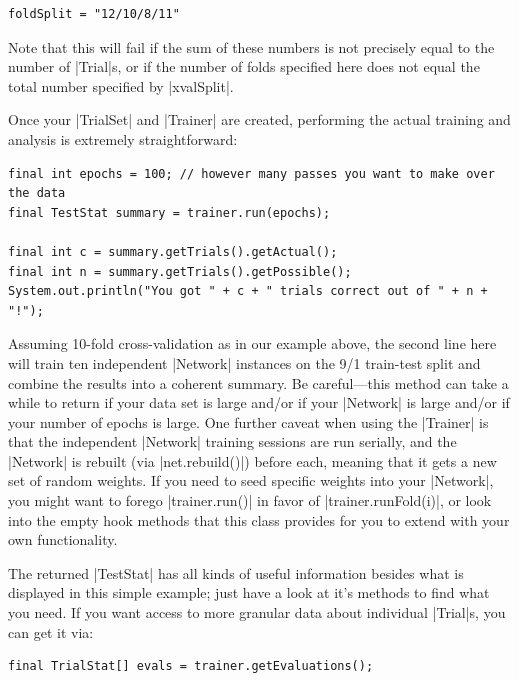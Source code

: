 \documentclass{article}
\begin{document}
\begin{verbatim}
foldSplit = "12/10/8/11"
\end{verbatim}

Note that this will fail if the sum of these numbers is not precisely equal to the number of  |Trial|s,
or if the number of folds specified here does not equal the total number specified by |xvalSplit|.

Once your  |TrialSet| and |Trainer| are created, performing the actual training and analysis
is extremely straightforward:


\begin{verbatim}
final int epochs = 100; // however many passes you want to make over the data
final TestStat summary = trainer.run(epochs);

final int c = summary.getTrials().getActual();
final int n = summary.getTrials().getPossible();
System.out.println("You got " + c + " trials correct out of " + n + "!");
\end{verbatim}

Assuming 10-fold cross-validation as in our example above, the second line here will train ten
independent |Network| instances on the 9/1 train-test split and combine the results into a coherent
summary. Be careful---this method can take a while to return if your data set is large and/or if
your |Network| is large and/or if your number of epochs is large. One further caveat when using the 
|Trainer| is that the independent |Network| training sessions are run serially, and the
|Network| is rebuilt (via |net.rebuild()|) before each, meaning that it gets a new set of random
weights. If you need to seed specific weights into your |Network|, you might want to forego 
|trainer.run()| in favor of |trainer.runFold(i)|, or look into the empty hook methods that this class
provides for you to extend with your own functionality.

The returned |TestStat| has all kinds of useful information besides what is displayed in this 
simple example; just have a look at it's methods to find what you need. If you want access to more
granular data about individual  |Trial|s, you can get it via:

\begin{verbatim}
final TrialStat[] evals = trainer.getEvaluations();
\end{verbatim}
\end{document}
